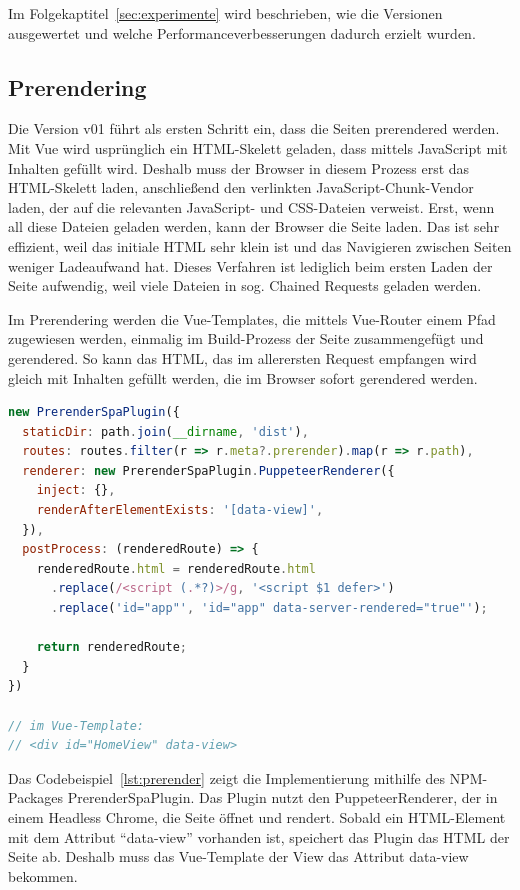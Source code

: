 \documentclass[11pt,a4paper]{article}
\begin{document}
Im Folgekaptitel~\ref{sec:experimente} wird beschrieben, wie die Versionen ausgewertet und welche Performanceverbesserungen dadurch erzielt wurden.

\subsection{Prerendering}
Die Version v01 führt als ersten Schritt ein, dass die Seiten prerendered werden.
Mit Vue wird usprünglich ein HTML-Skelett geladen, dass mittels JavaScript mit Inhalten gefüllt wird.
Deshalb muss der Browser in diesem Prozess erst das HTML-Skelett laden, anschließend den verlinkten JavaScript-Chunk-Vendor laden, der auf die relevanten JavaScript- und CSS-Dateien verweist.
Erst, wenn all diese Dateien geladen werden, kann der Browser die Seite laden.
Das ist sehr effizient, weil das initiale HTML sehr klein ist und das Navigieren zwischen Seiten weniger Ladeaufwand hat.
Dieses Verfahren ist lediglich beim ersten Laden der Seite aufwendig, weil viele Dateien in sog. Chained Requests geladen werden.

Im Prerendering werden die Vue-Templates, die mittels Vue-Router einem Pfad zugewiesen werden, einmalig im Build-Prozess der Seite zusammengefügt und gerendered.
So kann das HTML, das im allerersten Request empfangen wird gleich mit Inhalten gefüllt werden, die im Browser sofort gerendered werden.

\begin{lstlisting}[language=JavaScript, caption={Implementierung des Single Page Prerenderings mithilfe des PrerenderSpaPlugins}, label={lst:prerender}]
new PrerenderSpaPlugin({
  staticDir: path.join(__dirname, 'dist'),
  routes: routes.filter(r => r.meta?.prerender).map(r => r.path),
  renderer: new PrerenderSpaPlugin.PuppeteerRenderer({
    inject: {},
    renderAfterElementExists: '[data-view]',
  }),
  postProcess: (renderedRoute) => {
    renderedRoute.html = renderedRoute.html
      .replace(/<script (.*?)>/g, '<script $1 defer>')
      .replace('id="app"', 'id="app" data-server-rendered="true"');

    return renderedRoute;
  }
})

// im Vue-Template:
// <div id="HomeView" data-view>
\end{lstlisting}

Das Codebeispiel~\ref{lst:prerender} zeigt die Implementierung mithilfe des NPM-Packages PrerenderSpaPlugin.
Das Plugin nutzt den PuppeteerRenderer, der in einem Headless Chrome, die Seite öffnet und rendert.
Sobald ein HTML-Element mit dem Attribut \enquote{data-view} vorhanden ist, speichert das Plugin das HTML der Seite ab.
Deshalb muss das Vue-Template der View das Attribut data-view bekommen.
\end{document}
